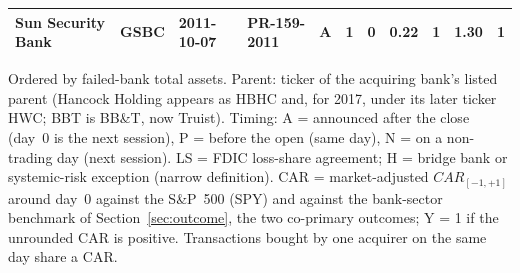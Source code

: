 \begin{table}[!t]
\begin{tabular*}{\textwidth}{@{\extracolsep{\fill}}llllccccccc}
Sun Security Bank & GSBC & 2011-10-07 & PR-159-2011 & A & 1 & 0 & 0.22 & 1 & 1.30 & 1 \\
\bottomrule
\end{tabular*}
\par\vspace{2pt}\parbox{0.96\textwidth}{\scriptsize Ordered by failed-bank total assets. Parent: ticker of the acquiring bank's listed parent (Hancock
Holding appears as HBHC and, for 2017, under its later ticker HWC; BBT is BB\&T, now Truist). Timing: A = announced after the
close (day~0 is the next session), P = before the open (same day), N = on a non-trading day (next session).
LS = FDIC loss-share agreement; H = bridge bank or systemic-risk exception (narrow definition). CAR = market-adjusted
$CAR_{[-1,+1]}$ around day~0 against the S\&P~500 (SPY) and against the bank-sector benchmark of Section~\ref{sec:outcome}, the two co-primary
outcomes; Y = 1 if the unrounded CAR is positive. Transactions bought by one acquirer on the same day share a CAR.}
\end{table}
